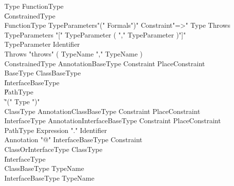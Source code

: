 \begin{grammar}
Type \: FunctionType \\
    \| ConstrainedType  \\

FunctionType \: TypeParameters\opt \xcd"(" Formals\opt \xcd")" Constraint\opt \xcd"=>" Type Throws\opt \\
TypeParameters \: \xcd"[" TypeParameter ( \xcd"," TypeParameter )\star \xcd"]" \\
TypeParameter \: Identifier \\
Throws \: \xcd"throws" ( TypeName \xcd"," TypeName )\star \\

ConstrainedType \: Annotation\star BaseType Constraint\opt
PlaceConstraint\opt \\

BaseType \: ClassBaseType \\
     \| InterfaceBaseType \\
     \| PathType \\
     \| \xcd"(" Type \xcd")" \\

ClassType \: Annotation\star ClassBaseType Constraint\opt
PlaceConstraint\opt \\
InterfaceType \: Annotation\star InterfaceBaseType Constraint\opt
PlaceConstraint\opt \\

PathType \: Expression \xcd"." Identifier \\

Annotation \: \xcd"@" InterfaceBaseType Constraint\opt \\

ClassOrInterfaceType \: ClassType \\ \| InterfaceType \\
ClassBaseType \: TypeName \\
InterfaceBaseType \: TypeName \\
\end{grammar}

% 


